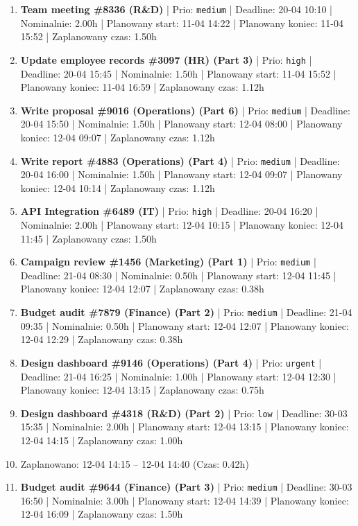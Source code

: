 {\begin{enumerate}
  \item [\textbf{14649}] \textbf{Team meeting \#8336 (R\&D)} | Prio: \texttt{medium} | Deadline: 20-04 10:10 | Nominalnie: 2.00h | Planowany start: 11-04 14:22 | Planowany koniec: 11-04 15:52 | Zaplanowany czas: 1.50h
  \item [\textbf{14621}] \textbf{Update employee records \#3097 (HR) (Part 3)} | Prio: \texttt{high} | Deadline: 20-04 15:45 | Nominalnie: 1.50h | Planowany start: 11-04 15:52 | Planowany koniec: 11-04 16:59 | Zaplanowany czas: 1.12h
  \item [\textbf{14662}] \textbf{Write proposal \#9016 (Operations) (Part 6)} | Prio: \texttt{medium} | Deadline: 20-04 15:50 | Nominalnie: 1.50h | Planowany start: 12-04 08:00 | Planowany koniec: 12-04 09:07 | Zaplanowany czas: 1.12h
  \item [\textbf{14651}] \textbf{Write report \#4883 (Operations) (Part 4)} | Prio: \texttt{medium} | Deadline: 20-04 16:00 | Nominalnie: 1.50h | Planowany start: 12-04 09:07 | Planowany koniec: 12-04 10:14 | Zaplanowany czas: 1.12h
  \item [\textbf{14620}] \textbf{API Integration \#6489 (IT)} | Prio: \texttt{high} | Deadline: 20-04 16:20 | Nominalnie: 2.00h | Planowany start: 12-04 10:15 | Planowany koniec: 12-04 11:45 | Zaplanowany czas: 1.50h
  \item [\textbf{14653}] \textbf{Campaign review \#1456 (Marketing) (Part 1)} | Prio: \texttt{medium} | Deadline: 21-04 08:30 | Nominalnie: 0.50h | Planowany start: 12-04 11:45 | Planowany koniec: 12-04 12:07 | Zaplanowany czas: 0.38h
  \item [\textbf{14644}] \textbf{Budget audit \#7879 (Finance) (Part 2)} | Prio: \texttt{medium} | Deadline: 21-04 09:35 | Nominalnie: 0.50h | Planowany start: 12-04 12:07 | Planowany koniec: 12-04 12:29 | Zaplanowany czas: 0.38h
  \item [\textbf{14606}] \textbf{Design dashboard \#9146 (Operations) (Part 4)} | Prio: \texttt{urgent} | Deadline: 21-04 16:25 | Nominalnie: 1.00h | Planowany start: 12-04 12:30 | Planowany koniec: 12-04 13:15 | Zaplanowany czas: 0.75h
  \item [\textbf{14691}] \textbf{Design dashboard \#4318 (R\&D) (Part 2)} | Prio: \texttt{low} | Deadline: 30-03 15:35 | Nominalnie: 2.00h | Planowany start: 12-04 13:15 | Planowany koniec: 12-04 14:15 | Zaplanowany czas: 1.00h
  \item [\textbf{PRZERWA}] Zaplanowano: 12-04 14:15 -- 12-04 14:40 (Czas: 0.42h)
  \item [\textbf{14659}] \textbf{Budget audit \#9644 (Finance) (Part 3)} | Prio: \texttt{medium} | Deadline: 30-03 16:50 | Nominalnie: 3.00h | Planowany start: 12-04 14:39 | Planowany koniec: 12-04 16:09 | Zaplanowany czas: 1.50h

\end{enumerate}}
